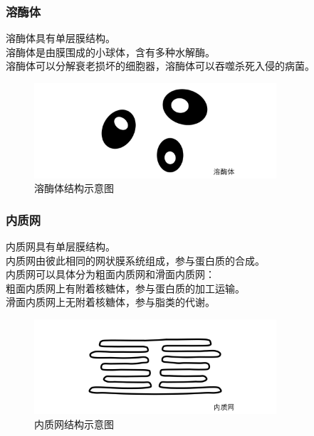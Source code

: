 \documentclass[UTF8]{ctexart}
\begin{document}
\subsubsection{溶酶体}
    溶酶体具有单层膜结构。\\[2mm]
    溶酶体是由膜围成的小球体，含有多种水解酶。\\[2mm]
    溶酶体可以分解衰老损坏的细胞器，溶酶体可以吞噬杀死入侵的病菌。
    \begin{figure}[h!]
        \begin{center}
            \includegraphics[width=9cm]{BiologyImage/10.jpg}
            \caption{溶酶体结构示意图}
        \end{center}
    \end{figure}

\newpage

\subsubsection{内质网}
    内质网具有单层膜结构。\\[3mm]
    内质网由彼此相同的网状膜系统组成，参与蛋白质的合成。\\[4mm]
    内质网可以具体分为粗面内质网和滑面内质网：\\[2mm]
    粗面内质网上有附着核糖体，参与蛋白质的加工运输。\\[2mm]
    滑面内质网上无附着核糖体，参与脂类的代谢。
    \begin{figure}[h]
        \begin{center}
            \includegraphics[width=9cm]{BiologyImage/6.jpg}
            \caption{内质网结构示意图}
        \end{center}
    \end{figure}
\end{document}
